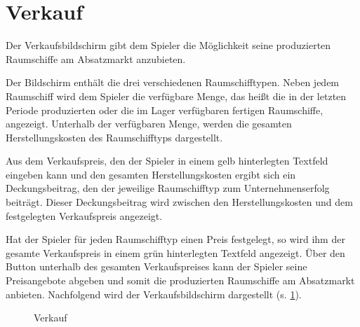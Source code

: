 \section{Verkauf}
\label{sec:ui-verkauf}

Der Verkaufsbildschirm gibt dem Spieler die Möglichkeit seine produzierten Raumschiffe am Absatzmarkt anzubieten.
 
Der Bildschirm enthält die drei verschiedenen Raumschifftypen. Neben jedem Raumschiff wird dem Spieler die verfügbare Menge, das heißt die in der letzten Periode produzierten oder die im Lager verfügbaren fertigen Raumschiffe, angezeigt. Unterhalb der verfügbaren Menge, werden die gesamten Herstellungskosten des Raumschifftyps dargestellt. 
 
Aus dem Verkaufspreis, den der Spieler in einem gelb hinterlegten Textfeld eingeben kann und den gesamten Herstellungskosten ergibt sich ein Deckungsbeitrag, den der jeweilige Raumschifftyp zum Unternehmenserfolg beiträgt. Dieser Deckungsbeitrag wird zwischen den Herstellungskosten und dem festgelegten Verkaufspreis angezeigt.
 
Hat der Spieler für jeden Raumschifftyp einen Preis festgelegt, so wird ihm der gesamte Verkaufspreis in einem grün hinterlegten Textfeld angezeigt. Über den Button unterhalb des gesamten Verkaufspreises kann der Spieler seine Preisangebote abgeben und somit die produzierten Raumschiffe am Absatzmarkt anbieten.  Nachfolgend wird der Verkaufsbildschirm dargestellt (s. \ref{img:ui-verkauf}).

\begin{figure}[h]
  \centering
  \caption{Verkauf}
  \label{img:ui-verkauf}
\end{figure}

\autorende{}
